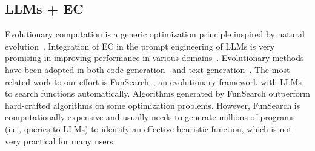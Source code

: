 \subsection{LLMs + EC}
Evolutionary computation is a generic optimization principle inspired by natural evolution~\cite{back1997handbook,eiben2015evolutionary}. Integration of EC in the prompt engineering of LLMs is very promising in improving performance in various domains~\cite{guo2023connecting,lehman2023evolution,wu2024evolutionary}. Evolutionary methods have been adopted in both code generation~\cite{liventsev2023fully,ma2023eureka,Lehman2024,hemberg2024evolving} and text generation~\cite{guo2023connecting,fernando2023promptbreeder,xu2023wizardlm}. The most related work to our effort is FunSearch~\cite{romera2024mathematical}, an evolutionary framework with LLMs to search functions automatically. Algorithms generated by FunSearch outperform hard-crafted algorithms on some optimization problems. However, FunSearch is computationally expensive and usually needs to generate millions of programs (i.e., queries to LLMs) to identify an effective heuristic function, which is not very practical for many users.


\vspace{1pt}